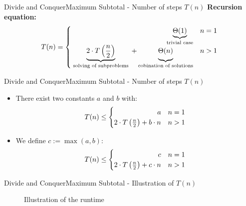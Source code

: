 

\begin{frame}{Divide and Conquer}{Maximum Subtotal - Number of steps $T(n)$}
  \textbf{Recursion equation:}
  \begin{displaymath}
    T(n) = \begin{cases}
      \hfill \underbrace{\Theta(1)}_\text{trivial case} & n = 1\\
      \underbrace{2 \cdot T\left(\frac{n}{2}\right)}_\text{
        solving of subproblems
      } + \underbrace{
        \Theta(n)
        \vphantom{\left(\frac{n}{2}\right)}
      }_\text{cobination of solutions} & n > 1
    \end{cases}
  \end{displaymath}
\end{frame}


\begin{frame}{Divide and Conquer}{Maximum Subtotal - Number of steps $T(n)$}
  \begin{itemize}
    \item
      There exist two constants $a$ and $b$ with:
      \begin{displaymath}
        T(n) \leq \begin{cases}
          \hfill a & n = 1\\
          2 \cdot T\left(\frac{n}{2}\right) + b \cdot n & n > 1
        \end{cases}
      \end{displaymath}
    \item
      We define $c := \max(a,b)$:
      \begin{displaymath}
        T(n) \leq \begin{cases}
          \hfill c & n = 1\\
          2 \cdot T\left(\frac{n}{2}\right) + c \cdot n & n > 1
        \end{cases}
      \end{displaymath}
  \end{itemize}
\end{frame}


\begin{frame}{Divide and Conquer}{Maximum Subtotal - Illustration of $T(n)$}
  \begin{figure}
    \begin{adjustbox}{width=\linewidth}
      
    \end{adjustbox}
    \caption{Illustration of the runtime}
    \label{fig:divide_and_conquer:max_sub_array_runtime}
  \end{figure}
\end{frame}

